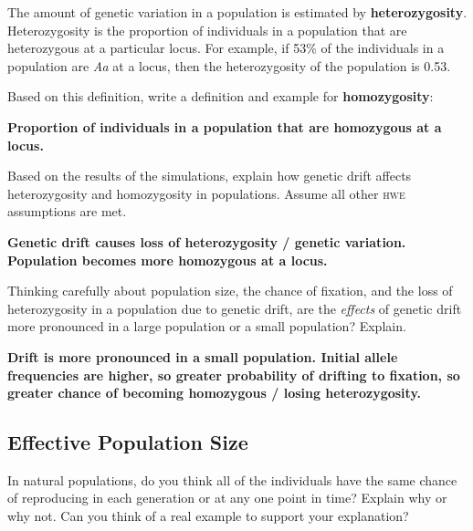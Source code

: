 \documentclass[11pt, addpoints, hidelinks]{exam}
\begin{document}
\begin{questions}
The amount of genetic variation in a population is estimated by
\textbf{heterozygosity}. Heterozygosity is the proportion of individuals
in a population that are heterozygous at a particular locus. For
example, if 53\% of the individuals in a population are \emph{Aa} at a
locus, then the heterozygosity of the population is 0.53.


\question[1] Based on this definition, write a definition and example
for \textbf{homozygosity}:

\begin{minipage}[t][2.5cm]{\textwidth}
	\ifprintanswers
		\textbf{Proportion of individuals in a population that are homozygous at a locus.}
	\fi
\end{minipage}

\newpage

\question[2] Based on the results of the simulations, explain how
genetic drift affects heterozygosity and homozygosity in populations.
Assume all other \textsc{hwe} assumptions are met.

\begin{minipage}[t][5cm]{\textwidth}
	\ifprintanswers
		\textbf{Genetic drift causes loss of heterozygosity / genetic variation.  Population becomes more homozygous at a locus.}
	\fi
\end{minipage}


\question[2] Thinking carefully about population size, the chance of
fixation, and the loss of heterozygosity in a population due to genetic
drift, are the \emph{effects} of genetic drift more pronounced in a
large population or a small population? Explain.

\begin{minipage}[t][5cm]{\textwidth}
	\ifprintanswers
		\textbf{Drift is more pronounced in a small population.  Initial allele frequencies are higher, so greater probability of drifting to fixation, so greater chance of becoming homozygous / losing heterozygosity.}
	\fi
\end{minipage}

\subsection*{Effective Population Size}

\question[1] In natural populations, do you think all of the individuals
have the same chance of reproducing in each generation or at any one
point in time? Explain why or why not. Can you think of a real example
to support your explanation?


\end{questions}
\end{document}
